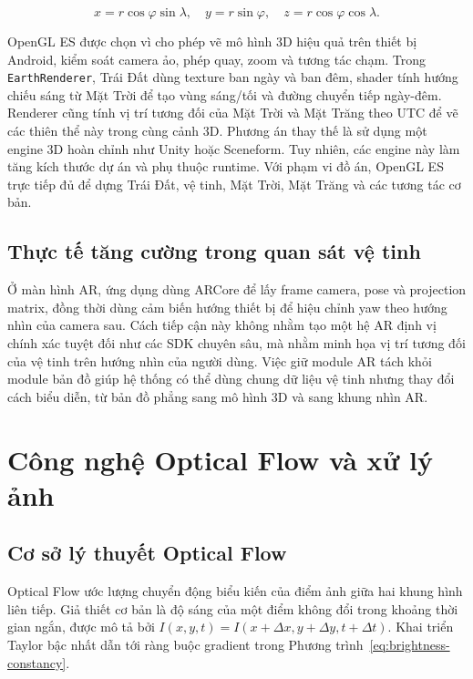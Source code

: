 \documentclass[../DoAn.tex]{subfiles}
\begin{document}
\begin{equation}
\label{eq:spherical-cartesian}
x = r \cos\varphi \sin\lambda,\quad
y = r \sin\varphi,\quad
z = r \cos\varphi \cos\lambda.
\end{equation}

OpenGL ES được chọn vì cho phép vẽ mô hình 3D hiệu quả trên thiết bị Android, kiểm soát camera ảo, phép quay, zoom và tương tác chạm. Trong \texttt{EarthRenderer}, Trái Đất dùng texture ban ngày và ban đêm, shader tính hướng chiếu sáng từ Mặt Trời để tạo vùng sáng/tối và đường chuyển tiếp ngày-đêm. Renderer cũng tính vị trí tương đối của Mặt Trời và Mặt Trăng theo UTC để vẽ các thiên thể này trong cùng cảnh 3D. Phương án thay thế là sử dụng một engine 3D hoàn chỉnh như Unity hoặc Sceneform. Tuy nhiên, các engine này làm tăng kích thước dự án và phụ thuộc runtime. Với phạm vi đồ án, OpenGL ES trực tiếp đủ để dựng Trái Đất, vệ tinh, Mặt Trời, Mặt Trăng và các tương tác cơ bản.

\subsection{Thực tế tăng cường trong quan sát vệ tinh}
\label{subsection:3.3.3}
Ở màn hình AR, ứng dụng dùng ARCore để lấy frame camera, pose và projection matrix, đồng thời dùng cảm biến hướng thiết bị để hiệu chỉnh yaw theo hướng nhìn của camera sau. Cách tiếp cận này không nhằm tạo một hệ AR định vị chính xác tuyệt đối như các SDK chuyên sâu, mà nhằm minh họa vị trí tương đối của vệ tinh trên hướng nhìn của người dùng. Việc giữ module AR tách khỏi module bản đồ giúp hệ thống có thể dùng chung dữ liệu vệ tinh nhưng thay đổi cách biểu diễn, từ bản đồ phẳng sang mô hình 3D và sang khung nhìn AR.

\section{Công nghệ Optical Flow và xử lý ảnh}
\label{section:3.4}
\subsection{Cơ sở lý thuyết Optical Flow}
\label{subsection:3.4.1}
Optical Flow ước lượng chuyển động biểu kiến của điểm ảnh giữa hai khung hình liên tiếp. Giả thiết cơ bản là độ sáng của một điểm không đổi trong khoảng thời gian ngắn, được mô tả bởi $I(x,y,t)=I(x+\Delta x,y+\Delta y,t+\Delta t)$. Khai triển Taylor bậc nhất dẫn tới ràng buộc gradient trong Phương trình~\ref{eq:brightness-constancy}.
\end{document}
